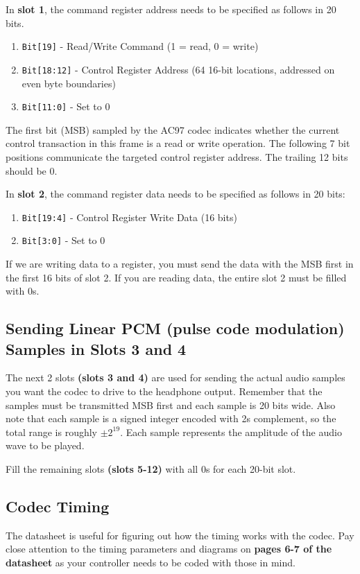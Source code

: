\documentclass[11pt]{article}
\begin{document}
In \textbf{slot 1}, the command register address needs to be specified as follows in 20 bits.
\begin{enumerate}
	\item \verb|Bit[19]| - Read/Write Command (1 = read, 0 = write)
	\item \verb|Bit[18:12]| - Control Register Address (64 16-bit locations, addressed on even byte boundaries)
	\item \verb|Bit[11:0]| - Set to 0
\end{enumerate}

The first bit (MSB) sampled by the AC97 codec indicates whether the current control transaction in this frame is a read or write operation. The following 7 bit positions communicate the targeted control register address. The trailing 12 bits should be 0.

In \textbf{slot 2}, the command register data needs to be specified as follows in 20 bits:

\begin{enumerate}
	\item \verb|Bit[19:4]| - Control Register Write Data (16 bits)
	\item \verb|Bit[3:0]| - Set to 0
\end{enumerate}

If we are writing data to a register, you must send the data with the MSB first in the first 16 bits of slot 2. If you are reading data, the entire slot 2 must be filled with 0s.

\subsection{Sending Linear PCM (pulse code modulation) Samples in Slots 3 and 4}
The next 2 slots \textbf{(slots 3 and 4)} are used for sending the actual audio samples you want the codec to drive to the headphone output. Remember that the samples must be transmitted MSB first and each sample is 20 bits wide. Also note that each sample is a signed integer encoded with 2s complement, so the total range is roughly $\pm 2^{19}$. Each sample represents the amplitude of the audio wave to be played.

Fill the remaining slots \textbf{(slots 5-12)} with all 0s for each 20-bit slot.

\subsection{Codec Timing}
The datasheet is useful for figuring out how the timing works with the codec. Pay close attention to the timing parameters and diagrams on \textbf{pages 6-7 of the datasheet} as your controller needs to be coded with those in mind.
\end{document}
